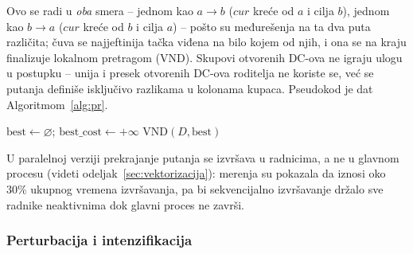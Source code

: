 \documentclass[12pt,a4paper]{article}
\begin{document}
Ovo se radi u \textit{oba} smera -- jednom kao $a \to b$ ($cur$ kreće od $a$
i cilja $b$), jednom kao $b \to a$ ($cur$ kreće od $b$ i cilja $a$) -- pošto
su međurešenja na ta dva puta različita; čuva se najjeftinija tačka viđena
na bilo kojem od njih, i ona se na kraju finalizuje lokalnom pretragom
(VND). Skupovi otvorenih DC-ova ne igraju ulogu u postupku --
unija i presek otvorenih DC-ova roditelja ne koriste se, već se putanja definiše
isključivo razlikama u kolonama kupaca. Pseudokod je dat
Algoritmom~\ref{alg:pr}.

\begin{algorithm}[H]
\caption{PathRelinking$(a, b, D)$}
\label{alg:pr}
\SetAlgoLined
$\text{best} \leftarrow \varnothing$;\quad
$\text{best\_cost} \leftarrow +\infty$\;
\Return VND$(D, \text{best})$
\end{algorithm}

U paralelnoj verziji prekrajanje putanja se izvršava u radnicima, a ne u glavnom
procesu (videti odeljak~\ref{sec:vektorizacija}): merenja su pokazala da iznosi oko $30\%$
ukupnog vremena izvršavanja, pa bi sekvencijalno izvršavanje držalo sve radnike
neaktivnima dok glavni proces ne završi.

\subsubsection{Perturbacija i intenzifikacija}
\end{document}
